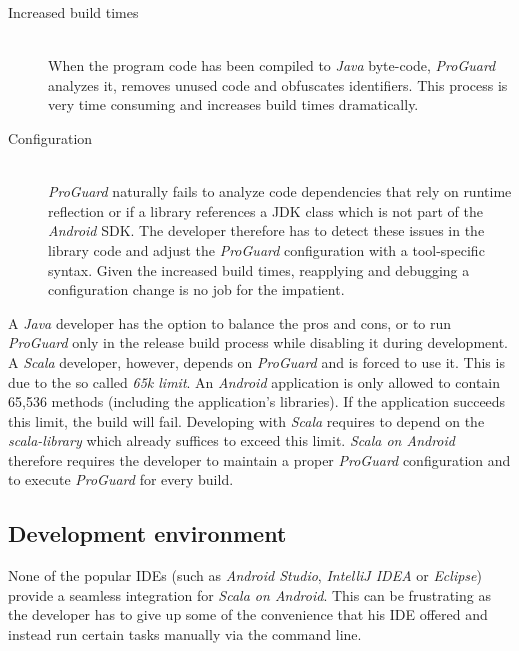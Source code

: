 \begin{description}

	\item[Increased build times]\hfill \\

	When the program code has been compiled to \textit{Java} byte-code, \textit{ProGuard} analyzes it, removes unused code and obfuscates identifiers. This process is very time consuming and increases build times dramatically.

	\item[Configuration]\hfill \\

	\textit{ProGuard} naturally fails to analyze code dependencies that rely on runtime reflection or if a library references a \ac{JDK} class which is not part of the \textit{Android} \ac{SDK}. The developer therefore has to detect these issues in the library code and adjust the \textit{ProGuard} configuration with a tool-specific syntax. Given the increased build times, reapplying and debugging a configuration change is no job for the impatient.

\end{description}

A \textit{Java} developer has the option to balance the pros and cons, or to run \textit{ProGuard} only in the release build process while disabling it during development. A \textit{Scala} developer, however, depends on \textit{ProGuard} and is forced to use it. This is due to the so called \textit{65k limit}. An \textit{Android} application is only allowed to contain 65,536 methods (including the application's libraries). If the application succeeds this limit, the build will fail. Developing with \textit{Scala} requires to depend on the \textit{scala-library} which already suffices to exceed this limit. \textit{Scala on Android} therefore requires the developer to maintain a proper \textit{ProGuard} configuration and to execute \textit{ProGuard} for every build.

\subsection{Development environment}

None of the popular \acp{IDE} (such as \textit{Android Studio}, \textit{IntelliJ IDEA} or \textit{Eclipse}) provide a seamless integration for \textit{Scala on Android}. This can be frustrating as the developer has to give up some of the convenience that his \ac{IDE} offered and instead run certain tasks manually via the command line.